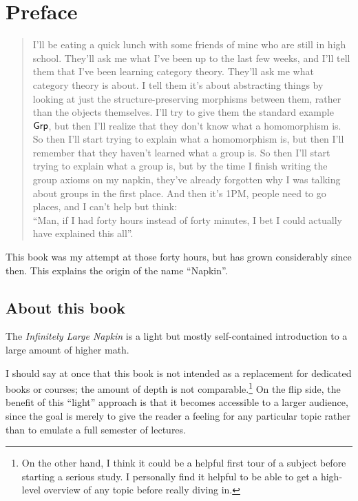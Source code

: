 \chapter*{Preface}

\begin{quote}
\small
I'll be eating a quick lunch with some friends of mine
who are still in high school.
They'll ask me what I've been up to the last few weeks,
and I'll tell them that I've been learning category theory.
They'll ask me what category theory is about.
I tell them it's about abstracting things by looking at just the
structure-preserving morphisms between them, rather than the objects themselves.
I'll try to give them the standard example $\mathsf{Grp}$,
but then I'll realize that they don't know what a homomorphism is.
So then I'll start trying to explain what a homomorphism is,
but then I'll remember that they haven't learned what a group is.
So then I'll start trying to explain what a group is,
but by the time I finish writing the group axioms on my napkin,
they've already forgotten why I was talking about groups in the first place.
And then it's 1PM, people need to go places, and I can't help but think: \\
``Man, if I had forty hours instead of forty minutes,
I bet I could actually have explained this all''.
\end{quote}
This book was my attempt at those forty hours,
but has grown considerably since then.
This explains the origin of the name ``Napkin''.

\section*{About this book}
The \emph{Infinitely Large Napkin} is a light
but mostly self-contained introduction to a large
amount of higher math.

I should say at once that this book is not intended
as a replacement for dedicated books or courses;
the amount of depth is not comparable.\footnote{On the other hand,
	I think it could be a helpful first tour of a subject
	before starting a serious study.
	I personally find it helpful to be able to get
	a high-level overview of any topic before really diving in.}
On the flip side, the benefit of this ``light'' approach
is that it becomes accessible to a larger audience,
since the goal is merely to give the reader a feeling for
any particular topic rather than to emulate a full semester of lectures.

